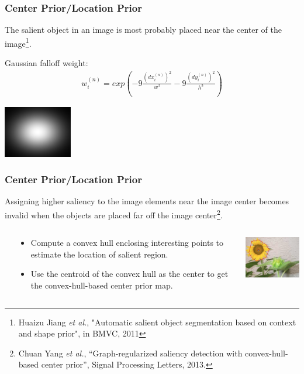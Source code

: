 \documentclass[notheorems,serif,table,compress]{beamer}  %
\begin{document}
\begin{frame}
\frametitle{ Center Prior/Location Prior}
{\color{blue}The salient object in an image is most probably placed near the center of the image}\footnote{Huaizu Jiang \textit{et al.}, "Automatic salient object segmentation based on context and shape prior", in BMVC, 2011}{\color{blue}.}

\vspace{0.2in}

Gaussian falloff weight:
\begin{align}
w_i^{(n)} = exp\left(-9\frac{(dx_i^{(n)})^2}{w^2}-9\frac{(dy_i^{(n)})^2}{h^2}\right)
\end{align}

\centering\includegraphics[width=3cm]{CBcolorPrior.png}
\end{frame}


\begin{frame}
\frametitle{ Center Prior/Location Prior}
Assigning higher saliency to the image elements near the image center becomes invalid when the objects are placed far off the image center\footnote{Chuan Yang \textit{et al.}, ``Graph-regularized saliency detection with convex-hull-based center prior'', Signal Processing Letters, 2013.}.
\begin{columns}
\begin{column}{\leftmargini}
\end{column}
\begin{column}{0.5\linewidth}
\begin{itemize}
\item Compute a convex hull enclosing interesting points to estimate the location of salient region.
\item Use the centroid of the convex hull as the center to get the convex-hull-based center prior map.
\end{itemize}
\end{column}
\begin{column}{0.5\linewidth}
\centering\includegraphics[width=4cm]{convexHull}
\end{column}
\end{columns}\vspace{1ex}
\end{frame}
\end{document}
